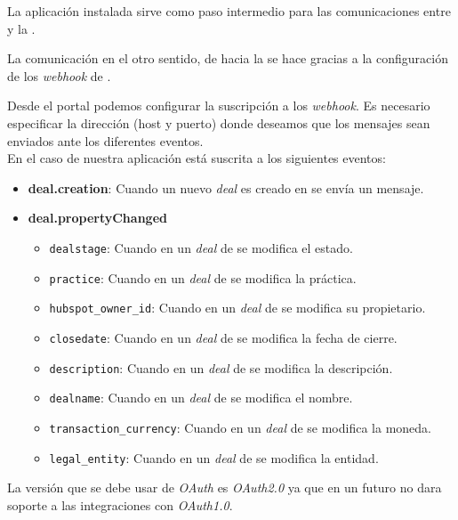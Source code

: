 La aplicación instalada sirve como paso intermedio para las comunicaciones entre \hs{} y la \iface{}.

La comunicación en el otro sentido, de \hs{} hacia la \iface{} se hace gracias a la configuración de los \textit{webhook} de \hs{}.

Desde el portal podemos configurar la suscripción a los \textit{webhook}. Es necesario especificar la dirección (host y puerto) donde deseamos que los mensajes sean enviados ante los diferentes eventos.\\

En el caso de nuestra aplicación está suscrita a los siguientes eventos:
\begin{itemize}
	\item \textbf{deal.creation}: Cuando un nuevo \textit{deal} es creado en \hs{} se envía un mensaje.
	\item \textbf{deal.propertyChanged} 
		\begin{itemize}
			\item \texttt{dealstage}: Cuando en un \textit{deal} de \hs{} se modifica el estado.
			\item \texttt{practice}: Cuando en un \textit{deal} de \hs{} se modifica la práctica.
			\item \texttt{hubspot\_owner\_id}: Cuando en un \textit{deal} de \hs{} se modifica su propietario.
			\item \texttt{closedate}: Cuando en un \textit{deal} de \hs{} se modifica la fecha de cierre.
			\item \texttt{description}: Cuando en un \textit{deal} de \hs{} se modifica la descripción.
			\item \texttt{dealname}: Cuando en un \textit{deal} de \hs{} se modifica el nombre.
			\item \texttt{transaction\_currency}: Cuando en un \textit{deal} de \hs{} se modifica la moneda.
			\item \texttt{legal\_entity}: Cuando en un \textit{deal} de \hs{} se modifica la entidad.
		\end{itemize}
\end{itemize}

La versión que se debe usar de \textit{OAuth} es \textit{OAuth2.0} ya que \hs{} en un futuro no dara soporte a las integraciones con \textit{OAuth1.0}.


\section{\wday{}}

